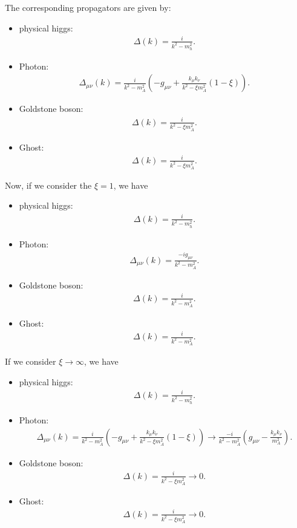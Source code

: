 The corresponding propagators are given by:
\begin{itemize}
    \item physical higgs:
    \begin{align}
        \Delta(k)=\frac{i}{k^2- m_h^2}.
    \end{align}
    \item Photon: 
    \begin{align}
        \Delta_{\mu\nu}(k)=\frac{i}{k^2-m_A^2}\left(-g_{\mu\nu}+\frac{k_\mu k_\nu}{k^2-\xi m_A^2}(1-\xi)\right).
    \end{align}
    \item Goldstone boson:
    \begin{align}
        \Delta(k)=\frac{i}{k^2-\xi m_A^2}.
    \end{align}
    \item Ghost:
    \begin{align}
        \Delta(k)=\frac{i}{k^2-\xi m_A^2}.
    \end{align}
\end{itemize}
Now, if we consider the $\xi=1$, we have 
\begin{itemize}
    \item physical higgs:
    \begin{align}
        \Delta(k)=\frac{i}{k^2- m_h^2}.
    \end{align}
    \item Photon: 
    \begin{align}
        \Delta_{\mu\nu}(k)=\frac{-ig_{\mu\nu}}{k^2-m_A^2}.
    \end{align}
    \item Goldstone boson:
    \begin{align}
        \Delta(k)=\frac{i}{k^2- m_A^2}.
    \end{align}
    \item Ghost:
    \begin{align}
        \Delta(k)=\frac{i}{k^2- m_A^2}.
    \end{align}
\end{itemize}
If we consider $\xi\to\infty$, we have 
\begin{itemize}
    \item physical higgs:
    \begin{align}
        \Delta(k)=\frac{i}{k^2- m_h^2}.
    \end{align}
    \item Photon: 
    \begin{align}
        \Delta_{\mu\nu}(k)=\frac{i}{k^2-m_A^2}\left(-g_{\mu\nu}+\frac{k_\mu k_\nu}{k^2-\xi m_A^2}(1-\xi)\right)\to\frac{-i}{k^2-m_A^2}\left(g_{\mu\nu}-\frac{k_\mu k_\nu}{ m_A^2}\right).
    \end{align}
    \item Goldstone boson:
    \begin{align}
        \Delta(k)=\frac{i}{k^2-\xi m_A^2}\to0.
    \end{align}
    \item Ghost:
    \begin{align}
        \Delta(k)=\frac{i}{k^2-\xi m_A^2}\to0.
    \end{align}
\end{itemize}
